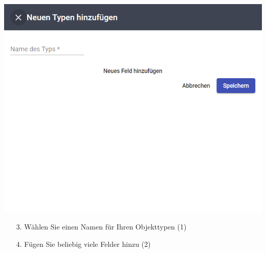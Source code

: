 \documentclass[11pt,a4paper]{report}
\begin{document}
	\begin{minipage}{0.5\linewidth}
	\includegraphics[width=\linewidth]{Objekttyp.png}
	\end{minipage}
	\hfill
	\begin{minipage}{0.4\linewidth}
	\begin{itemize}
		\item[3.] Wählen Sie einen Namen für Ihren Objekttypen (1)
		\item[4.] Fügen Sie beliebig viele Felder hinzu (2)
	\end{itemize}
	\end{minipage}\\
\end{document}
